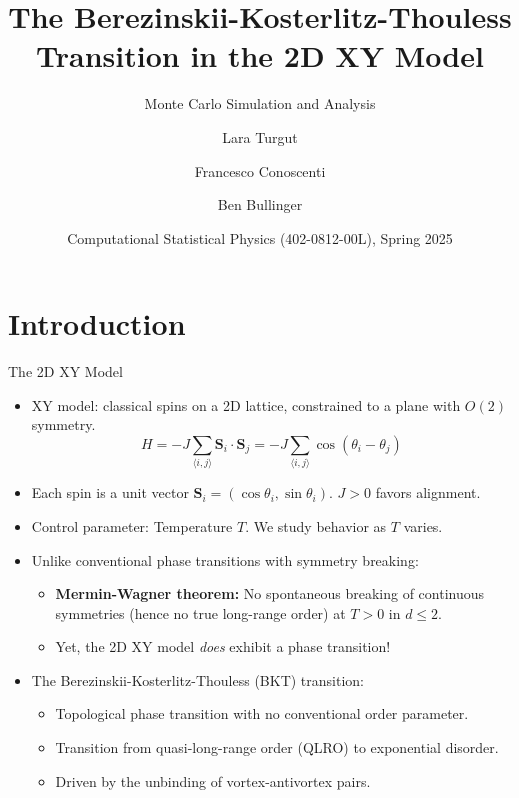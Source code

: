 \documentclass[11pt,aspectratio=169]{beamer}
\title{The Berezinskii-Kosterlitz-Thouless Transition in the 2D XY Model}
\subtitle{Monte Carlo Simulation and Analysis}
\author{Lara Turgut \and Francesco Conoscenti \and Ben Bullinger}
\institute{ETH Zürich\\ Department of Physics}
\date{Computational Statistical Physics (402-0812-00L), Spring 2025}
\begin{document}
\def\titlefigure{} %
\setlength{\titleboxwidth}{0.85\textwidth} %
\titleframe %

\tocframe %

\section{Introduction}

\begin{frame}{The 2D XY Model}
    \begin{itemize}
        \item XY model: classical spins on a 2D lattice, constrained to a plane with $O(2)$ symmetry.
        \begin{equation*}
            H = -J \sum_{\langle i,j \rangle} \mathbf{S}_i \cdot \mathbf{S}_j = -J \sum_{\langle i,j \rangle} \cos(\theta_i - \theta_j)
        \end{equation*}
        \item Each spin is a unit vector $\mathbf{S}_i = (\cos\theta_i, \sin\theta_i)$. $J>0$ favors alignment.
        \item Control parameter: Temperature $T$. We study behavior as $T$ varies.
        \pause
        \item Unlike conventional phase transitions with symmetry breaking:
            \begin{itemize}
                \item \textbf{Mermin-Wagner theorem:} No spontaneous breaking of continuous symmetries (hence no true long-range order) at $T > 0$ in $d \leq 2$.
                \item Yet, the 2D XY model \textit{does} exhibit a phase transition!
            \end{itemize}
        \pause
        \item The Berezinskii-Kosterlitz-Thouless (BKT) transition:
            \begin{itemize}
                \item Topological phase transition with no conventional order parameter.
                \item Transition from quasi-long-range order (QLRO) to exponential disorder.
                \item Driven by the unbinding of vortex-antivortex pairs.
            \end{itemize}
    \end{itemize}
\end{frame}
\end{document}
